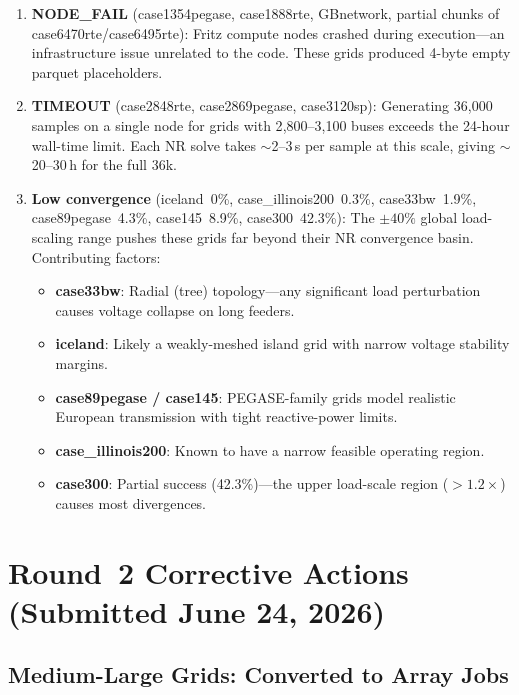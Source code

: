 \documentclass{article}
\begin{document}
\begin{enumerate}[leftmargin=*]
\item \textbf{NODE\_FAIL} (case1354pegase, case1888rte, GBnetwork, partial
  chunks of case6470rte/case6495rte): Fritz compute nodes crashed during
  execution---an infrastructure issue unrelated to the code.  These grids
  produced 4-byte empty parquet placeholders.

\item \textbf{TIMEOUT} (case2848rte, case2869pegase, case3120sp): Generating
  36{,}000 samples on a single node for grids with 2{,}800--3{,}100 buses
  exceeds the 24-hour wall-time limit.  Each NR solve takes $\sim$2--3\,s per
  sample at this scale, giving $\sim$20--30\,h for the full 36k.

\item \textbf{Low convergence} (iceland~0\%, case\_illinois200~0.3\%,
  case33bw~1.9\%, case89pegase~4.3\%, case145~8.9\%, case300~42.3\%):
  The $\pm40\%$ global load-scaling range pushes these grids far beyond their
  NR convergence basin.  Contributing factors:
  \begin{itemize}
    \item \textbf{case33bw}: Radial (tree) topology---any significant
      load perturbation causes voltage collapse on long feeders.
    \item \textbf{iceland}: Likely a weakly-meshed island grid with
      narrow voltage stability margins.
    \item \textbf{case89pegase / case145}: PEGASE-family grids model
      realistic European transmission with tight reactive-power limits.
    \item \textbf{case\_illinois200}: Known to have a narrow feasible
      operating region.
    \item \textbf{case300}: Partial success (42.3\%)---the upper load-scale
      region ($>1.2\times$) causes most divergences.
  \end{itemize}
\end{enumerate}


\section{Round~2 Corrective Actions (Submitted June 24, 2026)}
\label{sec:round2}

\subsection{Medium-Large Grids: Converted to Array Jobs}
\end{document}
